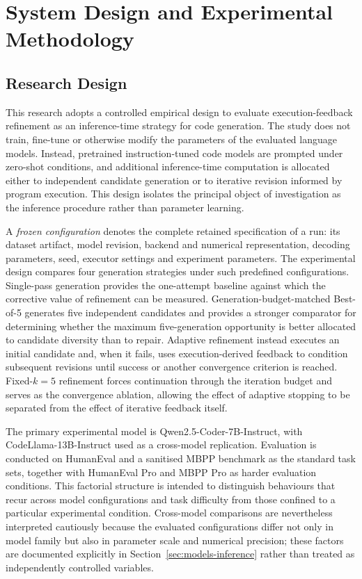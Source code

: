 \chapter{System Design and Experimental Methodology}

\section{Research Design}

This research adopts a controlled empirical design to evaluate execution-feedback refinement as an inference-time strategy for code generation. The study does not train, fine-tune or otherwise modify the parameters of the evaluated language models. Instead, pretrained instruction-tuned code models are prompted under zero-shot conditions, and additional inference-time computation is allocated either to independent candidate generation or to iterative revision informed by program execution. This design isolates the principal object of investigation as the inference procedure rather than parameter learning.

A \emph{frozen configuration} denotes the complete retained specification of a run: its dataset artifact, model revision, backend and numerical representation, decoding parameters, seed, executor settings and experiment parameters. The experimental design compares four generation strategies under such predefined configurations. Single-pass generation provides the one-attempt baseline against which the corrective value of refinement can be measured. Generation-budget-matched Best-of-5 generates five independent candidates and provides a stronger comparator for determining whether the maximum five-generation opportunity is better allocated to candidate diversity than to repair. Adaptive refinement instead executes an initial candidate and, when it fails, uses execution-derived feedback to condition subsequent revisions until success or another convergence criterion is reached. Fixed-$k=5$ refinement forces continuation through the iteration budget and serves as the convergence ablation, allowing the effect of adaptive stopping to be separated from the effect of iterative feedback itself.

The primary experimental model is Qwen2.5-Coder-7B-Instruct, with CodeLlama-13B-Instruct used as a cross-model replication. Evaluation is conducted on HumanEval and a sanitised MBPP benchmark as the standard task sets, together with HumanEval Pro and MBPP Pro as harder evaluation conditions. This factorial structure is intended to distinguish behaviours that recur across model configurations and task difficulty from those confined to a particular experimental condition. Cross-model comparisons are nevertheless interpreted cautiously because the evaluated configurations differ not only in model family but also in parameter scale and numerical precision; these factors are documented explicitly in Section~\ref{sec:models-inference} rather than treated as independently controlled variables.

